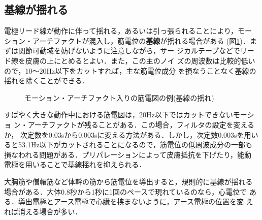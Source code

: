 \documentclass[10pt,twocolumn]{jarticle}
\begin{document}
\subsection{基線が揺れる}
電極リード線が動作に伴って揺れる，あるいは引っ張られることにより，モー
ション・アーチファクトが混入し，筋電位の{\bf 基線}が揺れる場合がある
(図\ref{fig:2-14})．まずは関節可動域を妨げないように注意しながら，サー
ジカルテープなどでリード線を皮膚の上にとめるとよい．また，この主のノイ
ズの周波数は比較的低いので，10〜20Hz以下をカットすれば，主な筋電位成分
を損なうことなく基線の揺れを除くことができる．

\begin{figure}[h]
  \centering
  \caption{モーション・アーチファクト入りの筋電図の例(基線の揺れ)
    \label{fig:2-14}}
 \end{figure}

すばやく大きな動作中における筋電図は，20Hz以下ではカットできないモーショ
ン・アーチファクトが残ることがある．この場合，フィルタの設定を変えるか，
次定数を0.03sから0.003sに変える方法がある．しかし，次定数0.003sを用い
ると53.1Hz以下がカットされることになるので，筋電位の低周波成分の一部も
損なわれる問題がある．プリパレーションによって皮膚抵抗を下げたり，能動
電極を用いることで基線揺れを抑えられる．

大胸筋や僧帽筋など体幹の筋から筋電位を導出すると，規則的に基線が揺れる
場合がある．大体0.8秒から1秒に1回のペースで現れているのなら，心電位で
ある．導出電極とアース電極で心臓を挟まないように，アース電極の位置を変
えれば消える場合が多い．
\end{document}
